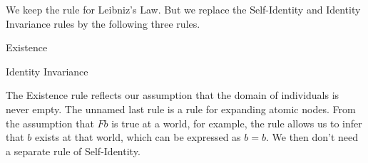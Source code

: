 \bigskip

We keep the rule for Leibniz's Law. But we replace the Self-Identity and Identity Invariance rules by the following three rules.

\bigskip

\begin{minipage}{0.32\textwidth}\centering
    Existence
    
\end{minipage}
\begin{minipage}{0.32\textwidth}\centering
    Identity Invariance
    
    \bigskip
\end{minipage}
\begin{minipage}{0.32\textwidth}\centering
{}
\end{minipage}


\bigskip

The Existence rule reflects our assumption that the domain of individuals is
never empty. The unnamed last rule is a rule for expanding atomic nodes. From the
assumption that $Fb$ is true at a world, for example, the rule allows us to
infer that $b$ exists at that world, which can be expressed as $b\!=\!b$. We
then don't need a separate rule of Self-Identity.

